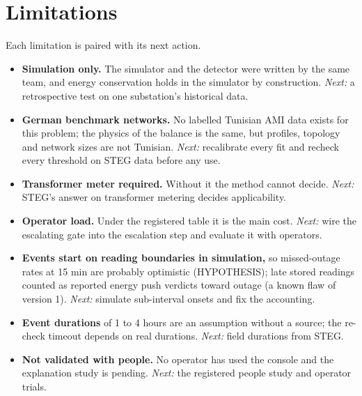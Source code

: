 \section{Limitations}\label{sec:limitations}
Each limitation is paired with its next action.
\begin{itemize}
\item \textbf{Simulation only.} The simulator and the detector were written by the same team, and
energy conservation holds in the simulator by construction. \emph{Next:} a retrospective test on one
substation's historical data.
\item \textbf{German benchmark networks.} No labelled Tunisian AMI data exists for this problem; the
physics of the balance is the same, but profiles, topology and network sizes are not Tunisian.
\emph{Next:} recalibrate every fit and recheck every threshold on STEG data before any use.
\item \textbf{Transformer meter required.} Without it the method cannot decide. \emph{Next:} STEG's
answer on transformer metering decides applicability.
\item \textbf{Operator load.} Under the registered table it is the main cost. \emph{Next:} wire the
escalating gate into the escalation step and evaluate it with operators.
\item \textbf{Events start on reading boundaries in simulation,} so missed-outage rates at 15 min are
probably optimistic (HYPOTHESIS); late stored readings counted as reported energy push verdicts toward
outage (a known flaw of version 1). \emph{Next:} simulate sub-interval onsets and fix the accounting.
\item \textbf{Event durations} of 1 to 4 hours are an assumption without a source; the re-check
timeout depends on real durations. \emph{Next:} field durations from STEG.
\item \textbf{Not validated with people.} No operator has used the console and the explanation study
is pending. \emph{Next:} the registered people study and operator trials.
\end{itemize}
